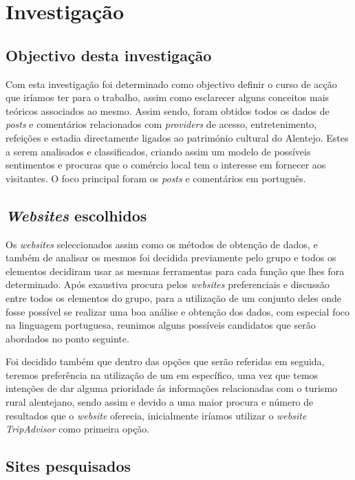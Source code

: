 \chapter{Investigação}
\label{cap2}
\section{Objectivo desta investigação}

Com esta investigação foi determinado como objectivo definir o curso de acção que iríamos ter para o trabalho, assim como esclarecer alguns conceitos mais teóricos associados ao mesmo. 
Assim sendo, foram obtidos todos os dados de \textit{posts} e comentários relacionados com \textit{providers} de acesso, entretenimento, refeições e estadia directamente ligados ao património cultural do Alentejo. Estes a serem analisados e classificados, criando assim um modelo de possíveis sentimentos e procuras que o comércio local tem o interesse em fornecer aos visitantes. O foco principal foram os \textit{posts} e comentários em português.

\section{\textit{Websites} escolhidos}

Os \textit{websites} seleccionados assim como os métodos de obtenção de dados, e também de analisar os mesmos foi decidida previamente pelo grupo e todos os elementos decidiram usar as mesmas ferramentas para cada função que lhes fora determinado.
Após exaustiva procura pelos \textit{websites} preferenciais e discussão entre todos os elementos do grupo, para a utilização de um conjunto deles onde fosse possível se realizar uma boa análise e obtenção dos dados, com especial foco na linguagem portuguesa, reunimos alguns possíveis candidatos que serão abordados no ponto seguinte.

Foi decidido também que dentro das opções que serão referidas em seguida, teremos preferência na utilização de um em específico, uma vez que temos intenções de dar alguma prioridade ás informações relacionadas com o turismo rural alentejano, sendo assim e devido a uma maior procura e número de resultados que o \textit{website} oferecia, inicialmente iríamos utilizar o \textit{website TripAdvisor} como primeira opção.

\section{Sites pesquisados}

